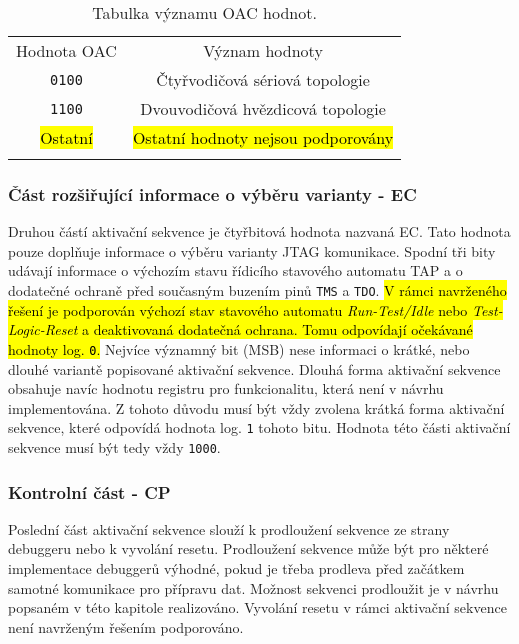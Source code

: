 \begin{table}[!h]
  \caption{Tabulka významu OAC hodnot. \cite{IEEE_1149-7}}
  \begin{center}
  	\small
	  \begin{tabular}{!{\vrule width 1.2pt}c|c!{\vrule width 1.2pt}}
	    Hodnota \acs{OAC} & Význam hodnoty\\
			\texttt{0100} & Čtyřvodičová sériová topologie\\
			\hline
			\texttt{1100} & Dvouvodičová hvězdicová topologie\\
			\hline
			\hl{Ostatní} & \hl{Ostatní hodnoty nejsou podporovány}\\
			\hline
		\end{tabular}
  \end{center}
	\label{tab:oac}
\end{table}

\subsubsection{Část rozšiřující informace o výběru varianty - \acs{EC}}
Druhou částí aktivační sekvence je čtyřbitová hodnota nazvaná \acl{EC}. Tato hodnota pouze doplňuje informace o výběru varianty \acs{JTAG} komunikace. Spodní tři bity udávají informace o výchozím stavu řídicího stavového automatu \acs{TAP} a o dodatečné ochraně před současným buzením pinů \texttt{\acs{TMS}} a \texttt{\acs{TDO}}. \hl{V rámci navrženého řešení je podporován výchozí stav stavového automatu \textit{Run-Test/Idle} nebo \textit{Test-Logic-Reset} a deaktivovaná dodatečná ochrana. Tomu odpovídají očekávané hodnoty log. \texttt{0}.} Nejvíce významný bit (\acs{MSB}) nese informaci o krátké, nebo dlouhé variantě popisované aktivační sekvence. Dlouhá forma aktivační sekvence obsahuje navíc hodnotu registru pro funkcionalitu, která není v návrhu implementována. Z tohoto důvodu musí být vždy zvolena krátká forma aktivační sekvence, které odpovídá hodnota log. \texttt{1} tohoto bitu. Hodnota této části aktivační sekvence musí být tedy vždy \texttt{1000}. \cite{IEEE_1149-7}

\subsubsection{Kontrolní část - \acs{CP}}
Poslední část aktivační sekvence slouží k prodloužení sekvence ze strany debuggeru nebo k vyvolání resetu. Prodloužení sekvence může být pro některé implementace debuggerů výhodné, pokud je třeba prodleva před začátkem samotné komunikace pro přípravu dat. Možnost sekvenci prodloužit je v návrhu popsaném v této kapitole realizováno. Vyvolání resetu v rámci aktivační sekvence není navrženým řešením podporováno. \cite{IEEE_1149-7}

